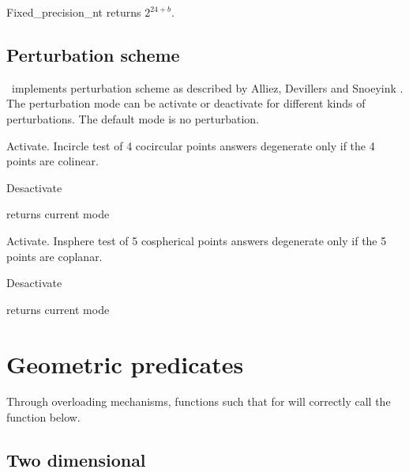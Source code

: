 \begin{ccClass} {Fixed_precision_nt}
{returns $2^{24+b}$.}

\subsection{Perturbation scheme}

\ccClassName\ implements perturbation scheme as described by
Alliez, Devillers and Snoeyink
\cite{ads-rdppw-98}.
The perturbation mode can be activate or deactivate for different kinds
of perturbations. The default mode is no perturbation.

{Activate. Incircle test of 4 cocircular points answers degenerate only if
the 4 points are colinear.}

{Desactivate}

{returns current mode}

{Activate. Insphere test of 5 cospherical points answers degenerate only if
the 5 points are coplanar.}

{Desactivate}

{returns current mode}

\section{Geometric predicates}

Through overloading mechanisms, functions such that
 for 
will correctly call the function below.


\subsection{Two dimensional}



\end{ccClass}
